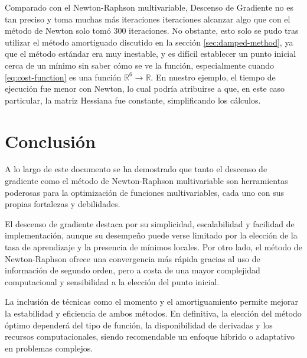 \documentclass[conference]{IEEEtran}
\begin{document}
Comparado con el Newton-Raphson multivariable, Descenso de Gradiente no es tan preciso y toma muchas más iteraciones iteraciones alcanzar algo que con el método de Newton solo tomó 300 iteraciones. No obstante, esto solo se pudo tras utilizar el método amortiguado discutido en la sección \ref{sec:damped-method}, ya que el método estándar era muy inestable, y es difícil establecer un punto inicial cerca de un mínimo sin saber cómo se ve la función, especialmente cuando \eqref{eq:cost-function} es una función $\mathbb{R}^{6}\to\mathbb{R}$. En nuestro ejemplo, el tiempo de ejecución fue menor con Newton, lo cual podría atribuirse a que, en este caso particular, la matriz Hessiana fue constante, simplificando los cálculos.

\section{Conclusión}
A lo largo de este documento se ha demostrado que tanto el descenso de gradiente como el método de Newton-Raphson multivariable son herramientas poderosas para la optimización de funciones multivariables, cada uno con sus propias fortalezas y debilidades. 

El descenso de gradiente destaca por su simplicidad, escalabilidad y facilidad de implementación, aunque su desempeño puede verse limitado por la elección de la tasa de aprendizaje y la presencia de mínimos locales. Por otro lado, el método de Newton-Raphson ofrece una convergencia más rápida gracias al uso de información de segundo orden, pero a costa de una mayor complejidad computacional y sensibilidad a la elección del punto inicial. 

La inclusión de técnicas como el momento y el amortiguamiento permite mejorar la estabilidad y eficiencia de ambos métodos. En definitiva, la elección del método óptimo dependerá del tipo de función, la disponibilidad de derivadas y los recursos computacionales, siendo recomendable un enfoque híbrido o adaptativo en problemas complejos.
\end{document}
